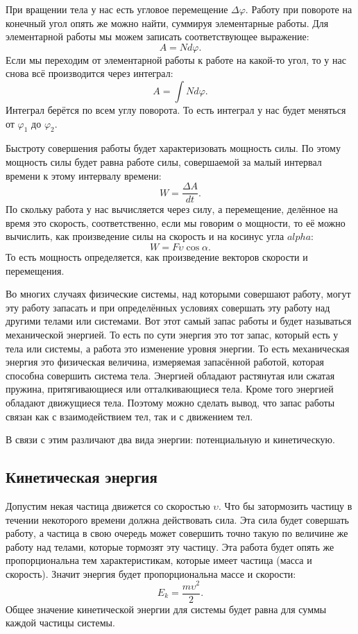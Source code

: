 При вращении тела у нас есть угловое перемещение $\Delta \varphi$. Работу при
повороте на конечный угол опять же можно найти, суммируя элементарные работы.
Для элементарной работы мы можем записать соответствующее выражение: \[
	A = N d \varphi
	.\] Если мы переходим от элементарной работы к работе на какой-то угол, то у
нас снова всё производится через интеграл: \[
	A = \int N d \varphi
	.\] Интеграл берётся по всем углу поворота. То есть интеграл у нас будет
меняться от $\varphi_1$ до $\varphi_2$.

Быстроту совершения работы будет характеризовать мощность силы. По этому
мощность силы будет равна работе силы, совершаемой за малый интервал времени к
этому интервалу времени: \[
	W = \frac{\Delta A}{d t}
	.\] По скольку работа у нас вычисляется через силу, а перемещение, делённое на
время это скорость, соответственно, если мы говорим о мощности, то её можно
вычислить, как произведение силы на скорость и на косинус угла $alpha$: \[
	W = F \upsilon \cos \alpha
	.\] То есть мощность определяется, как произведение векторов скорости и
перемещения.

Во многих случаях физические системы, над которыми совершают работу, могут эту
работу запасать и при определённых условиях совершать эту работу над другими
телами или системами. Вот этот самый запас работы и будет называться
механической энергией. То есть по сути энергия это тот запас, который есть у
тела или системы, а работа это изменение уровня энергии. То есть механическая
энергия это физическая величина, измеряемая запасённой работой, которая
способна совершить система тела. Энергией обладают растянутая или сжатая
пружина, притягивающиеся или отталкивающиеся тела. Кроме того энергией обладают
движущиеся тела. Поэтому можно сделать вывод, что запас работы связан как с
взаимодействием тел, так и с движением тел.

В связи с этим различают два вида энергии: потенциальную и кинетическую.

\subsection{Кинетическая энергия}

Допустим некая частица движется со скоростью $\upsilon$. Что бы затормозить
частицу в течении некоторого времени должна действовать сила. Эта сила будет
совершать работу, а частица в свою очередь может совершить точно такую по
величине же работу над телами, которые тормозят эту частицу. Эта работа будет
опять же пропорциональна тем характеристикам, которые имеет частица (масса и
скорость). Значит энергия будет пропорциональна массе и скорости: \[
	E_k = \frac{m \upsilon^2}{2}
	.\] Общее значение кинетической энергии для системы будет равна для суммы
каждой частицы системы.

